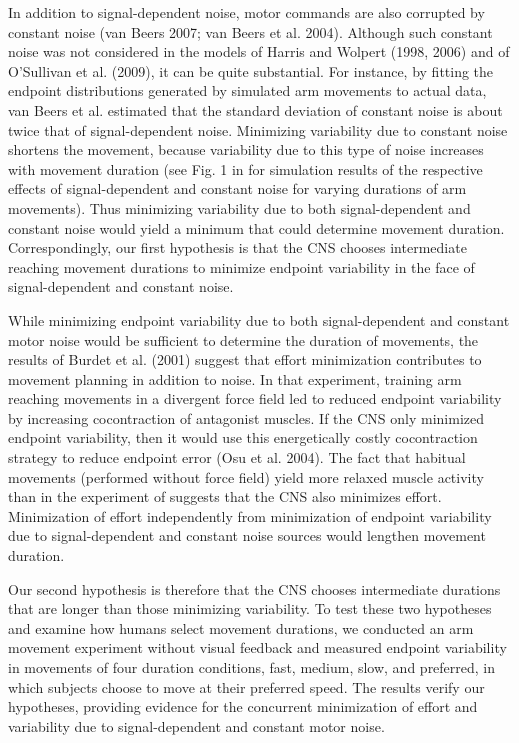 In addition to signal-dependent noise, motor commands are also corrupted by constant noise \cite{VanBeers2007, VanBeers2004} (van Beers 2007; van Beers et al. 2004). Although such constant noise was not considered in the models of \cite{Harris1998, Harris2006} Harris and Wolpert (1998, 2006) and of \cite{OSullivan2009} O’Sullivan et al. (2009), it can be quite substantial. For instance, by fitting the endpoint distributions generated by simulated arm movements to actual data, van Beers et al. \cite{VanBeers2004} estimated that the standard deviation of constant noise is about twice that of signal-dependent noise. 
Minimizing variability due to constant noise shortens the movement, because variability due to this type of noise increases with movement duration (see Fig. 1 in \cite{Todorov2005} for simulation results of the respective effects of signal-dependent and constant noise for varying durations of arm movements). 
Thus minimizing variability due to both signal-dependent and constant noise would yield a minimum that could determine movement duration. 
Correspondingly, our first hypothesis is that the CNS chooses intermediate reaching movement durations to minimize endpoint variability in the face of signal-dependent and constant noise.

While minimizing endpoint variability due to both signal-dependent and constant motor noise would be sufficient to determine the duration of movements, the results of \cite{Burdet2001} Burdet et al. (2001) suggest that effort minimization contributes to movement planning in addition to noise. 
In that experiment, training arm reaching movements in a divergent force field led to reduced endpoint variability by increasing cocontraction of antagonist muscles. If the CNS only minimized endpoint variability, then it would use this energetically costly cocontraction strategy to reduce endpoint error \cite{Osu2004} (Osu et al. 2004). The fact that habitual movements (performed without force field) yield more relaxed muscle activity than in the experiment of \cite{Burdet2001} suggests that the CNS also minimizes effort. 
Minimization of effort independently from minimization of endpoint variability due to signal-dependent and constant noise sources would lengthen movement duration.

Our second hypothesis is therefore that the CNS chooses intermediate durations that are longer than those minimizing variability. 
To test these two hypotheses and examine how humans select movement durations, we conducted an arm movement experiment without visual feedback and measured endpoint variability in movements of four duration conditions, fast, medium, slow, and preferred, in which subjects choose to move at their preferred speed. The results verify our hypotheses, providing evidence for the concurrent minimization of effort and variability due to signal-dependent and constant motor noise.

